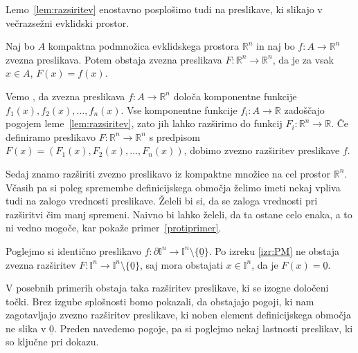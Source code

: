 \documentclass[mat1]{fmfdelo}
\newcommand{\R}{\mathbb R}
\newcommand{\I}{\mathbb I}
\newcommand{\0}{\underline{0}}
\begin{document}
Lemo~\ref{lem:razsiritev} enostavno posplošimo tudi na preslikave, ki slikajo v večrazsežni evklidski prostor.

\begin{posledica}
Naj bo $A$ kompaktna podmnožica evklidskega prostora $\R^n$ in naj bo \mbox{$f : A \to \R^n$} zvezna preslikava. Potem obstaja zvezna preslikava $F : \R^n \to \R^n$, da je za vsak $x \in A$, $F(x) = f(x)$.
\end{posledica}

\begin{dokaz}
Vemo , da zvezna preslikava $f : A \to \R^n$ določa komponentne funkcije $f_1(x), f_2(x), \dots , f_n(x)$. Vse komponentne funkcije $f_i : A \to \R$ zadoščajo pogojem leme~\ref{lem:razsiritev}, zato jih lahko razširimo do funkcij $F_i : \R^n \to \R$. Če definiramo preslikavo $F : \R^n \to \R^n$ s predpisom $F(x) = (F_1(x), F_2(x), \dots , F_n(x))$, dobimo zvezno razširitev preslikave $f$.
\end{dokaz}
Sedaj znamo razširiti zvezno preslikavo iz kompaktne množice na cel prostor $\R^n$. Včasih pa si poleg spremembe definicijskega območja želimo imeti nekaj vpliva tudi na zalogo vrednosti preslikave. Želeli bi si, da se zaloga vrednosti pri razširitvi čim manj spremeni. Naivno bi lahko želeli, da ta ostane celo enaka, a to ni vedno mogoče, kar pokaže primer~\ref{protiprimer}.

\begin{primer}\label{protiprimer}
Poglejmo si identično preslikavo $f : \partial \I^n \to \I^n \setminus \{ \0 \}$. Po izreku \ref{izr:PM} ne obstaja zvezna razširitev $F : \I^n \to \I^n \setminus \{ \0 \}$, saj mora obstajati $x \in \I^n$, da je $F(x) = \0$. 
\end{primer}

V posebnih primerih obstaja taka razširitev preslikave, ki se izogne določeni točki. Brez izgube splošnosti bomo pokazali, da obstajajo pogoji, ki nam zagotavljajo zvezno razširitev preslikave, ki noben element definicijskega območja ne slika v $\0$. Preden navedemo pogoje, pa si poglejmo nekaj lastnosti preslikav, ki so ključne pri dokazu.
\end{document}
